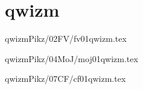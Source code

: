 \documentclass[9pt,xcolor={svgnames, x11names}]{beamer}
\def\scale{1} %
\begin{document}
% 		
% 		
% 		
% 		
% 		
%
%
%

\section{qwizm}
\begin{frame}{qwizmPikz/02FV/fv01qwizm.tex}
	\def\scale{0.8}
	\centering
	
\end{frame}
\begin{frame}{qwizmPikz/04MoJ/moj01qwizm.tex}
	\def\scale{0.8}
	\centering
	
\end{frame}
\begin{frame}{qwizmPikz/07CF/cf01qwizm.tex}
	\def\scale{0.8}
	\centering
	
\end{frame}
\end{document}

